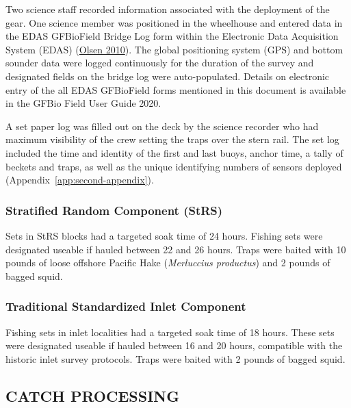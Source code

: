 \documentclass[12pt]{article}\usepackage[]{graphicx}\usepackage[]{color}
\begin{document}
Two science staff recorded information associated with the deployment of the gear. One science member was positioned in the wheelhouse and entered data in the EDAS GFBioField Bridge Log form within the Electronic Data Acquisition System (EDAS) (\protect\hyperlink{ref-Olsen2010}{Olsen 2010}). The global positioning system (GPS) and bottom sounder data were logged continuously for the duration of the survey and designated fields on the bridge log were auto-populated. Details on electronic entry of the all EDAS GFBioField forms mentioned in this document is available in the GFBio Field User Guide 2020.

A set paper log was filled out on the deck by the science recorder who had maximum visibility of the crew setting the traps over the stern rail. The set log included the time and identity of the first and last buoys, anchor time, a tally of beckets and traps, as well as the unique identifying numbers of sensors deployed (Appendix~\ref{app:second-appendix}).

\hypertarget{stratified-random-component-strs}{%
\subsubsection{Stratified Random Component (StRS)}\label{stratified-random-component-strs}}

Sets in StRS blocks had a targeted soak time of 24 hours. Fishing sets were designated useable if hauled between 22 and 26 hours. Traps were baited with 10 pounds of loose offshore Pacific Hake (\emph{Merluccius productus}) and 2 pounds of bagged squid.

\hypertarget{traditional-standardized-inlet-component}{%
\subsubsection{Traditional Standardized Inlet Component}\label{traditional-standardized-inlet-component}}

Fishing sets in inlet localities had a targeted soak time of 18 hours. These sets were designated useable if hauled between 16 and 20 hours, compatible with the historic inlet survey protocols. Traps were baited with 2 pounds of bagged squid.

\hypertarget{catch-processing}{%
\subsection{CATCH PROCESSING}\label{catch-processing}}
\end{document}
